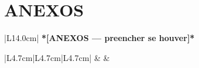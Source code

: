 ﻿\chapter*{ANEXOS}

\begin{longtable}{|L{14.0cm}|}
\hline
\textbf{*[ANEXOS --- preencher se houver]*} \\
\hline
\end{longtable}

\begin{longtable}{|L{4.7cm}|L{4.7cm}|L{4.7cm}|}
\hline
\textbf{} & \textbf{} & \textbf{} \\
\hline
\end{longtable}